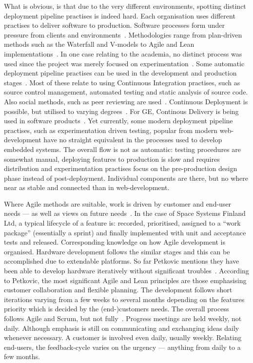\documentclass[english]{tktltiki2}
\begin{document}
What is obvious, is that due to the very different environments, spotting distinct deployment pipeline practises is indeed hard. Each organisation uses different practises to deliver software to production. Software processes form under pressure from clients and environments~\cite{Hol15a, Hol15b}. Methodologies range from plan-driven methods such as the Waterfall and V-models to Agile and Lean implementations~\cite{Hol15b, Koi15}. In one case relating to the academia, no distinct process was used since the project was merely focused on experimentation~\cite{Kri15}. Some automatic deployment pipeline practises can be used in the development and production stages~\cite{BT15, Hol15a, Hol15b, Koi15, Pet15}. Most of these relate to using Continuous Integration practises, such as source control management, automated testing and static analysis of source code. Also social methods, such as peer reviewing are used~\cite{Hol15b}. Continuous Deployment is possible, but utilised to varying degrees~\cite{BT15, Hol15a, Hol15b, Koi15}. For GE, Continous Delivery is being used in software products~\cite{BT15}. Yet currently, some modern deployment pipeline practises, such as experimentation driven testing, popular from modern web-development have no straight equivalent in the processes used to develop embedded systems. The overall flow is not as automatic: testing procedures are somewhat manual, deploying features to production is slow and requires distribution and experimentation practises focus on the pre-production design phase instead of post-deployment. Individual components are there, but no where near as stable and connected than in web-development.

Where Agile methods are suitable, work is driven by customer and end-user needs — as well as views on future needs~\cite{Pet15}. In the case of Space Systems Finland Ltd, a typical lifecycle of a feature is: recorded, prioritised, assigned to a “work package” (essentially a sprint) and finally implemented with unit and acceptance tests and released. Corresponding knowledge on how Agile development is organised. Hardware development follows the similar stages and this can be accomplished due to extendable platforms. So far Petkovic mentions they have been able to develop hardware iteratively without significant troubles~\cite{Pet15}. According to Petkovic, the most significant Agile and Lean principles are those emphasising customer collaboration and flexible planning. The development follows short iterations varying from a few weeks to several months depending on the features priority which is decided by the (end-)customers needs. The overall process follows Agile and Scrum, but not fully~\cite{Pet15}. Progress meetings are held weekly, not daily. Although emphasis is still on communicating and exchanging ideas daily whenever necessary. A customer is involved even daily, usually weekly. Relating end-users, the feedback-cycle varies on the urgency — anything from daily to a few months.
\end{document}

